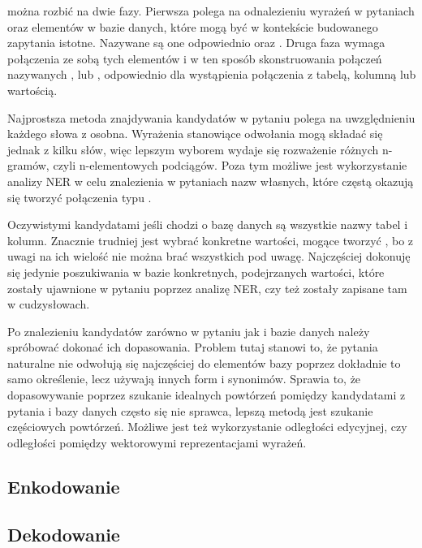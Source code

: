  można rozbić na dwie fazy. Pierwsza polega na odnalezieniu wyrażeń w pytaniach oraz elementów w bazie danych, które mogą być w kontekście budowanego zapytania istotne. Nazywane są one odpowiednio  oraz . Druga faza  wymaga połączenia ze sobą tych elementów i w ten sposób skonstruowania połączeń nazywanych ,  lub , odpowiednio dla wystąpienia połączenia z tabelą, kolumną lub wartością.


Najprostsza metoda znajdywania kandydatów w pytaniu polega na uwzględnieniu każdego słowa z osobna. Wyrażenia stanowiące odwołania mogą składać się jednak z kilku słów, więc lepszym wyborem wydaje się rozważenie różnych n-gramów, czyli n-elementowych podciągów. Poza tym możliwe jest wykorzystanie analizy NER w celu znalezienia w pytaniach nazw własnych, które częstą okazują się tworzyć połączenia typu .

Oczywistymi kandydatami jeśli chodzi o bazę danych są wszystkie nazwy tabel i kolumn. Znacznie trudniej jest wybrać konkretne wartości, mogące tworzyć , bo z uwagi na ich wielość nie można brać wszystkich pod uwagę. Najczęściej dokonuję się jedynie poszukiwania w bazie konkretnych, podejrzanych wartości, które zostały ujawnione w pytaniu poprzez analizę NER, czy też zostały zapisane tam w cudzysłowach.

Po znalezieniu kandydatów zarówno w pytaniu jak i bazie danych należy spróbować dokonać ich dopasowania. Problem tutaj stanowi to, że pytania naturalne nie odwołują się najczęściej do elementów bazy poprzez dokładnie to samo określenie, lecz używają innych form i synonimów. Sprawia to, że dopasowywanie poprzez szukanie idealnych powtórzeń pomiędzy kandydatami z pytania i bazy danych często się nie sprawca, lepszą metodą jest szukanie częściowych powtórzeń. Możliwe jest też wykorzystanie odległości edycyjnej, czy odległości pomiędzy wektorowymi reprezentacjami wyrażeń.

\subsection{Enkodowanie}
\subsection{Dekodowanie}
